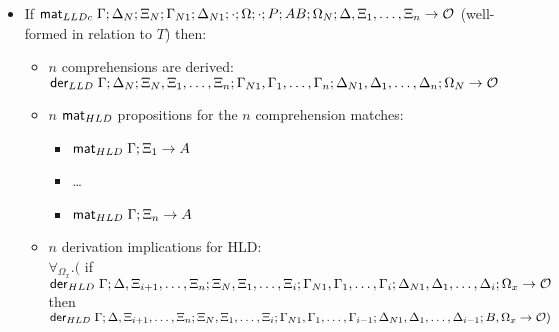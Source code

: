\begin{theorem}
\begin{itemize}[leftmargin=*]
   \item If $\mathsf{mat}_{LLDc} \; \Gamma; \Delta_N; \Xi_N; \Gamma_{N1}; \Delta_{N1}; \cdot; \Omega;
      \cdot; P; AB; \Omega_N; \Delta, \Xi_1, \dotsc, \Xi_n \rightarrow \mathcal{O}$ (well-formed in relation to $T$) then:

   \begin{itemize}[leftmargin=\secondm]
      \item $n$ comprehensions are derived:\\
      $\mathsf{der}_{LLD} \; \Gamma; \Delta_N; \Xi_N, \Xi_1, \dotsc, \Xi_n; \Gamma_{N1},
      \Gamma_1, \dotsc, \Gamma_n; \Delta_{N1}, \Delta_1, \dotsc, \Delta_n; \Omega_N \rightarrow \mathcal{O}$

      \item $n$ $\mathsf{mat}_{HLD} \;$propositions for the $n$ comprehension matches:
      \begin{itemize}[leftmargin=\thirdm]
         \item $\mathsf{mat}_{HLD} \; \Gamma; \Xi_1 \rightarrow A$
         \item \dots
         \item $\mathsf{mat}_{HLD} \; \Gamma; \Xi_n \rightarrow A$
      \end{itemize}

      \item $n$ derivation implications for HLD: \\
      $\forall_{\Omega_x}.($ if $\mathsf{der}_{HLD} \; \Gamma; \Delta, \Xi_{i+1}, \dotsc, \Xi_{n}; \Xi_N, \Xi_1,
            \dotsc, \Xi_i; \Gamma_{N1}, \Gamma_1, \dotsc, \Gamma_i; \Delta_{N1},
            \Delta_1, \dotsc, \Delta_i; \Omega_x \rightarrow \mathcal{O}$ then $\mathsf{der}_{HLD} \; \Gamma; \Delta, \Xi_{i+1}, \dotsc, \Xi_{n}; \Xi_N, \Xi_1,
            \dotsc,
            \Xi_i; \Gamma_{N1}, \Gamma_1, \dotsc, \Gamma_{i-1}; \Delta_{N1},
            \Delta_1, \dotsc, \Delta_{i-1}; B, \Omega_x \rightarrow \mathcal{O})$
   \end{itemize}

\end{itemize}
   
\end{theorem}
